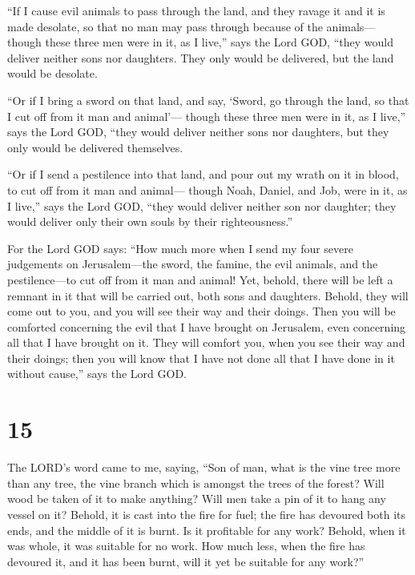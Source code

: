  ``If I cause evil animals to pass through the land, and
they ravage it and it is made desolate, so that no man may pass through
because of the animals---  though these three men were in
it, as I live,'' says the Lord GOD, ``they would deliver neither sons
nor daughters. They only would be delivered, but the land would be
desolate.

 ``Or if I bring a sword on that land, and say, `Sword,
go through the land, so that I cut off from it man and animal'---
 though these three men were in it, as I live,'' says the
Lord GOD, ``they would deliver neither sons nor daughters, but they only
would be delivered themselves.

 ``Or if I send a pestilence into that land, and pour out
my wrath on it in blood, to cut off from it man and animal---
 though Noah, Daniel, and Job, were in it, as I live,''
says the Lord GOD, ``they would deliver neither son nor daughter; they
would deliver only their own souls by their righteousness.''

 For the Lord GOD says: ``How much more when I send my
four severe judgements on Jerusalem---the sword, the famine, the evil
animals, and the pestilence---to cut off from it man and animal!
 Yet, behold, there will be left a remnant in it that
will be carried out, both sons and daughters. Behold, they will come out
to you, and you will see their way and their doings. Then you will be
comforted concerning the evil that I have brought on Jerusalem, even
concerning all that I have brought on it.  They will
comfort you, when you see their way and their doings; then you will know
that I have not done all that I have done in it without cause,'' says
the Lord GOD.

\hypertarget{section-13}{%
\section{15}\label{section-13}}

 The LORD's word came to me, saying,  ``Son
of man, what is the vine tree more than any tree, the vine branch which
is amongst the trees of the forest?  Will wood be taken of
it to make anything? Will men take a pin of it to hang any vessel on it?
 Behold, it is cast into the fire for fuel; the fire has
devoured both its ends, and the middle of it is burnt. Is it profitable
for any work?  Behold, when it was whole, it was suitable
for no work. How much less, when the fire has devoured it, and it has
been burnt, will it yet be suitable for any work?''

